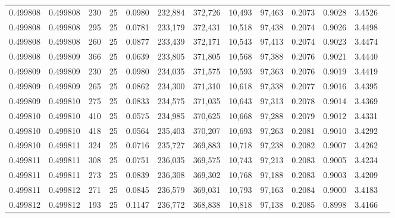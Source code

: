 \begin{tabular}{rrrrrrrrrrrrr}
0.499808 & 0.499808 &   230 &  25 &                                     0.0980 & 232,884 & 372,726 &  10,493 &  97,463 & 0.2073 & 0.9028 & 3.4526 \\
0.499808 & 0.499808 &   295 &  25 &                                     0.0781 & 233,179 & 372,431 &  10,518 &  97,438 & 0.2074 & 0.9026 & 3.4498 \\
0.499808 & 0.499808 &   260 &  25 &                                     0.0877 & 233,439 & 372,171 &  10,543 &  97,413 & 0.2074 & 0.9023 & 3.4474 \\
0.499808 & 0.499809 &   366 &  25 &                                     0.0639 & 233,805 & 371,805 &  10,568 &  97,388 & 0.2076 & 0.9021 & 3.4440 \\
0.499809 & 0.499809 &   230 &  25 &                                     0.0980 & 234,035 & 371,575 &  10,593 &  97,363 & 0.2076 & 0.9019 & 3.4419 \\
0.499809 & 0.499809 &   265 &  25 &                                     0.0862 & 234,300 & 371,310 &  10,618 &  97,338 & 0.2077 & 0.9016 & 3.4395 \\
0.499809 & 0.499810 &   275 &  25 &                                     0.0833 & 234,575 & 371,035 &  10,643 &  97,313 & 0.2078 & 0.9014 & 3.4369 \\
0.499810 & 0.499810 &   410 &  25 &                                     0.0575 & 234,985 & 370,625 &  10,668 &  97,288 & 0.2079 & 0.9012 & 3.4331 \\
0.499810 & 0.499810 &   418 &  25 &                                     0.0564 & 235,403 & 370,207 &  10,693 &  97,263 & 0.2081 & 0.9010 & 3.4292 \\
0.499810 & 0.499811 &   324 &  25 &                                     0.0716 & 235,727 & 369,883 &  10,718 &  97,238 & 0.2082 & 0.9007 & 3.4262 \\
0.499811 & 0.499811 &   308 &  25 &                                     0.0751 & 236,035 & 369,575 &  10,743 &  97,213 & 0.2083 & 0.9005 & 3.4234 \\
0.499811 & 0.499811 &   273 &  25 &                                     0.0839 & 236,308 & 369,302 &  10,768 &  97,188 & 0.2083 & 0.9003 & 3.4209 \\
0.499811 & 0.499812 &   271 &  25 &                                     0.0845 & 236,579 & 369,031 &  10,793 &  97,163 & 0.2084 & 0.9000 & 3.4183 \\
0.499812 & 0.499812 &   193 &  25 &                                     0.1147 & 236,772 & 368,838 &  10,818 &  97,138 & 0.2085 & 0.8998 & 3.4166 \\

\end{tabular}
